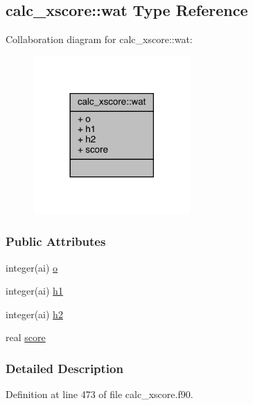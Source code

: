 \hypertarget{structcalc__xscore_1_1wat}{\subsection{calc\-\_\-xscore\-:\-:wat Type Reference}
\label{structcalc__xscore_1_1wat}
}


Collaboration diagram for calc\-\_\-xscore\-:\-:wat\-:
\nopagebreak
\begin{figure}[H]
\begin{center}
\leavevmode
\includegraphics[width=170pt]{structcalc__xscore_1_1wat__coll__graph}
\end{center}
\end{figure}
\subsubsection*{Public Attributes}
\begin{DoxyCompactItemize}
\item 
integer(ai) \hyperlink{structcalc__xscore_1_1wat_a5f49c0daae037a8ebeb4020f9af1bf9d}{o}
\item 
integer(ai) \hyperlink{structcalc__xscore_1_1wat_a2ae1e714b3e29efbfd0270e572cd3f3f}{h1}
\item 
integer(ai) \hyperlink{structcalc__xscore_1_1wat_aa5cacfb0a53be029afd98df80d38ccd7}{h2}
\item 
real \hyperlink{structcalc__xscore_1_1wat_a0d9bc34d49f28e5c37f9aab0584209fa}{score}
\end{DoxyCompactItemize}


\subsubsection{Detailed Description}


Definition at line 473 of file calc\-\_\-xscore.\-f90.



